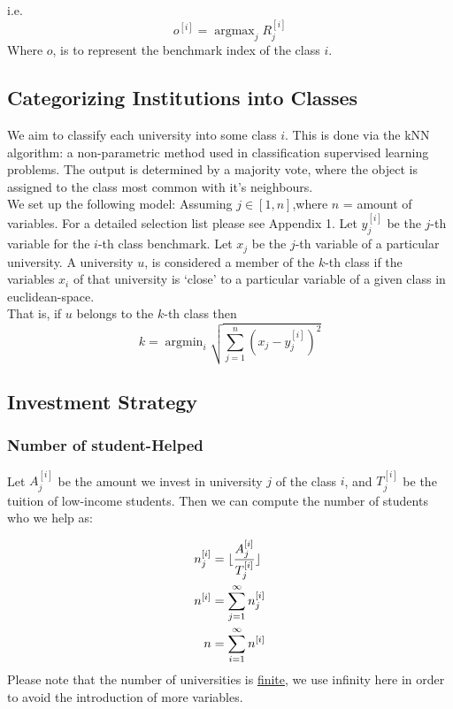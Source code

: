 \documentclass[12pt]{scrartcl}
\DeclarePairedDelimiter\floor{\lfloor}{\rfloor}
\newcommand{\argmax}{\mathop{\mathrm{argmax}}}
\newcommand{\argmin}{\mathop{\mathrm{argmin}}}
\begin{document}
	i.e.
	$$
		o^{[i]} = \argmax_{j} R_j^{[i]}
	$$
	Where $o$, is to represent the benchmark index of the class $i$.

	\subsection{Categorizing Institutions into Classes}
	
	We aim to classify each university into some class $i$. This is done via the kNN algorithm: a non-parametric method used in classification supervised learning problems. The output is determined by a majority vote, where the object is assigned to the class most common with it's neighbours. \cite{Hastie}\\

We set up the following model:
Assuming $j\in [1,n]$,where $n$ = amount of variables. For a detailed selection list please see Appendix 1. Let $y_j^{[i]}$ be the $j$-th variable for the $i$-th class benchmark. Let $x_j$ be the $j$-th variable of a particular university. A university $u$, is considered a member of the $k$-th class if the variables $x_i$ of that university is `close' to a particular variable of a given class in euclidean-space.\\
	
That is, if $u$ belongs to the $k$-th class then
	$$
		k = \argmin_{i} \sqrt{ \sum_{j=1}^n (x_j-y_j^{[i]})^2 }
	$$

	
	\subsection{Investment Strategy}

	\subsubsection{Number of student-Helped}
		Let $A_j^{[i]}$ be the amount we invest in university $j$ of the class $i$, and $T_j^{[i]}$ be the tuition of low-income students. Then we can compute the number of students who we help as:

		\begin{align*}
			n_j^{[i]} &= \floor{\frac{A_j^{[i]}}{T_j^{[i]}}}\\
			n^{[i]} &= \sum_{j=1}^\infty n_j^{[i]}\\
			n &= \sum_{i=1}^\infty n^{[i]}
		\end{align*}
		Please note that the number of universities is \underline{finite}, we use infinity here in order to avoid the introduction of more variables.\\
\end{document}
